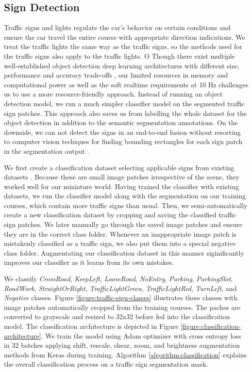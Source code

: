 \subsection{Sign Detection}

Traffic signs and lights regulate the car's behavior on certain conditions and
ensure the car travel the entire course with appropriate direction indications.
We treat the traffic lights the same way as the traffic signs, so the methods
used for the traffic signs also apply to the traffic lights.
O
Though there exist multiple well-established object detection deep learning
architectures with different size, performance and accuracy trade-offs
\cite{cite10}, our limited resources in memory and computational power as well
as the soft realtime requirements at 10 Hz challenges us to use a more
resource-friendly approach. Instead of running an object detection model, we
run a much simpler classifier model on the segmented traffic sign patches. This
approach also saves us from labelling the whole dataset for the object
detection in addition to the semantic segmentation annotations. On the
downside, we can not detect the signs in an end-to-end fasion without resorting
to computer vision techiques for finding bounding rectangles for each sign
patch in the segmentation output \cite{cite13}.

We first create a classification dataset selecting applicable signs from
existing datasets \cite{cite11, cite12}. Because these are small image patches
irrespective of the scene, they worked well for our miniature world. Having
trained the classifier with existing datasets, we run the classifier model
along with the segmentation on our training courses, which contain more traffic
signs than usual. Then, we semi-automatically create a new classification
dataset by cropping and saving the classified traffic sign patches. We later
manually go through the saved image patches and ensure they are in the correct
class folder. Whenever an inappropriate image patch is mistakenly classified as
a traffic sign, we also put them into a special negative class folder.
Augmentating our classification dataset in this manner siginificantly improves
our classifier as it learns from its own mistakes.

We classify \textit{CrossRoad}, \textit{KeepLeft}, \textit{LooseRoad},
\textit{NoEntry}, \textit{Parking}, \textit{ParkingSlot}, \textit{RoadWork},
\textit{StraightOrRight}, \textit{TrafficLightGreen}, \textit{TrafficLightRed},
\textit{TurnLeft}, and \textit{Negative} classes. Figure
\ref{figure:traffic-sign-classes} illustrates these classes with image patches
automatically cropped from the training courses. The paches are converted to
grayscale and resized to 32x32 before fed into the classification model. The
classification architecture is depicted in Figure
\ref{figure:classification-architecture}. We train the model using Adam
optimizer with cross entropy loss in 32 batches applying shift, rescale, shear,
zoom, and brightness augmentation methods from Keras during
training\cite{cite7, cite8}. Algorithm \ref{algorithm:classification} explains
the overall classification process on a traffic sign segmentation mask.

